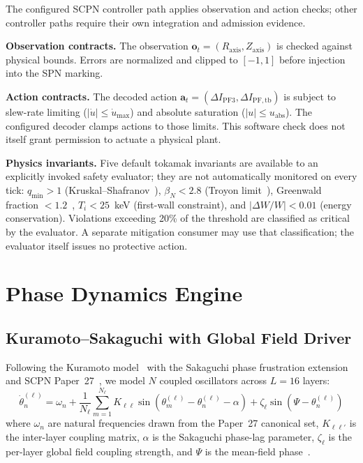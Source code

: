\documentclass[twocolumn,preprintnumbers,amsmath,amssymb,prl,floatfix]{revtex4-2}
\begin{document}
The configured SCPN controller path applies observation and action checks;
other controller paths require their own integration and admission evidence.

\textbf{Observation contracts.}\quad
The observation $\mathbf{o}_t = (R_\mathrm{axis}, Z_\mathrm{axis})$
is checked against physical bounds.  Errors are normalized and clipped
to $[-1, 1]$ before injection into the SPN marking.

\textbf{Action contracts.}\quad
The decoded action $\mathbf{a}_t = (\Delta I_\mathrm{PF3},
\Delta I_\mathrm{PF,tb})$ is subject to slew-rate limiting
($|\dot{u}| \leq \dot{u}_\mathrm{max}$) and absolute
saturation ($|u| \leq u_\mathrm{abs}$).
The configured decoder clamps actions to those limits. This software check
does not itself grant permission to actuate a physical plant.

\textbf{Physics invariants.}\quad
Five default tokamak invariants are available to an explicitly invoked
safety evaluator; they are not automatically monitored on every tick:
$q_\mathrm{min} > 1$ (Kruskal--Shafranov~\cite{freidberg2014}),
$\beta_N < 2.8$ (Troyon limit~\cite{troyon1984}),
Greenwald fraction $< 1.2$~\cite{greenwald2002},
$T_i < 25$~keV (first-wall constraint), and
$|\Delta W/W| < 0.01$ (energy conservation).
Violations exceeding 20\% of the threshold are classified as
critical by the evaluator. A separate mitigation consumer may use that
classification; the evaluator itself issues no protective action.


\section{Phase Dynamics Engine}
\label{sec:phase}

\subsection{Kuramoto--Sakaguchi with Global Field Driver}

Following the Kuramoto model~\cite{kuramoto1975} with the
Sakaguchi phase frustration extension~\cite{sakaguchi1986}
and SCPN Paper~27~\cite{sotek2026knm}, we model $N$ coupled
oscillators across $L = 16$ layers:
%
\begin{equation}
  \dot{\theta}_n^{(\ell)} = \omega_n
  + \frac{1}{N_\ell} \sum_{m=1}^{N_\ell} K_{\ell\ell}
    \sin\!\left(\theta_m^{(\ell)} - \theta_n^{(\ell)} - \alpha\right)
  + \zeta_\ell \sin\!\left(\Psi - \theta_n^{(\ell)}\right)
  \label{eq:kuramoto}
\end{equation}
%
where $\omega_n$ are natural frequencies drawn from the Paper~27
canonical set, $K_{\ell\ell'}$ is the inter-layer coupling matrix,
$\alpha$ is the Sakaguchi phase-lag parameter,
$\zeta_\ell$ is the per-layer global field coupling strength, and
$\Psi$ is the mean-field phase~\cite{acebron2005}.
\end{document}
